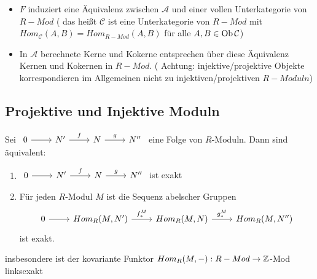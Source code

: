 \begin{anm}
	\begin{itemize}
		\item $F$ induziert eine Äquivalenz zwischen $\mathcal{A}$ und einer vollen Unterkategorie von $R-Mod $ ( das heißt $\mathcal{C} $ ist eine Unterkategorie von $R-Mod $ mit $ Hom_{\mathcal{C}}(A,B)= Hom_{R-Mod}(A,B) $ für alle $ A,B \in \text{Ob}\,\mathcal{C}$)
		\item In $\mathcal{A} $ berechnete Kerne und Kokerne entsprechen über diese Äquivalenz Kernen und Kokernen in $R-Mod$. ( Achtung: injektive/projektive Objekte korrespondieren im Allgemeinen nicht zu injektiven/projektiven $R-Moduln$)
	\end{itemize}
\end{anm}
\newpage 
\subsection{Projektive und Injektive Moduln}
\begin{sa}
	Sei $\begin{tikzcd}
	0  \arrow{r} & N' \arrow{r}{f} & N \arrow{r}{g} & N'' 
	\end{tikzcd} $ eine Folge von $R$-Moduln. Dann sind äquivalent: 
	\begin{enumerate} [label= \roman*)]
		\item $\begin{tikzcd}
		0  \arrow{r} & N' \arrow{r}{f} & N \arrow{r}{g} & N'' 
		\end{tikzcd} $ ist exakt
		\item Für jeden $R$-Modul $M$ ist die Sequenz abelscher Gruppen  $$\begin{tikzcd}
		0  \arrow{r} & Hom_{R}(M,N') \arrow{r}{f_{*}^{M}} & Hom_{R}(M,N)  \arrow{r}{g_{*}^{M}} & Hom_{R}(M,N'') 
		\end{tikzcd} $$ ist exakt.
	\end{enumerate}
	insbesondere ist der kovariante Funktor $Hom_R(M,-): R-Mod \to \mathbb{Z}$-Mod linksexakt
\end{sa}
